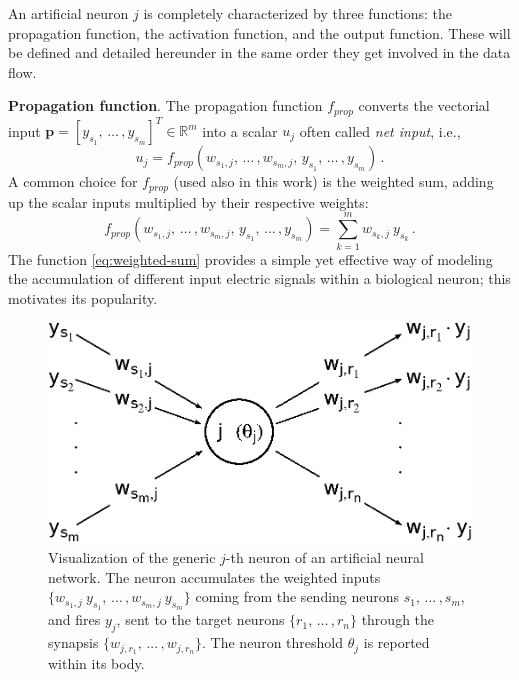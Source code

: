 \documentclass[12pt, a4paper, twoside, openright]{report}
\numberwithin{equation}{chapter}
\theoremstyle{theorem}
\theoremstyle{definition}
\theoremstyle{remark}
\theoremstyle{proposition}
\numberwithin{figure}{chapter}
\begin{document}
		An artificial neuron $j$ is completely characterized by three functions: the propagation function, the activation function, and the output function. These will be defined and detailed hereunder in the same order they get involved in the data flow. 
		
		\vspace*{0.3cm}
		
		\noindent \textbf{Propagation function}. The propagation function $f_{prop}$ converts the vectorial input $\mathbf{p} = [y_{s_1}, \, \ldots \, , y_{s_m}]^T \in \mathbb{R}^m$ into a scalar $u_{j}$ often called \emph{net input}, i.e.,
		\begin{equation}
			\label{eq:propagation-function}
			u_{j} = f_{prop}(w_{s_1,j}, \, \ldots \, , w_{s_m,j}, \, y_{s_1}, \, \ldots \, , y_{s_m}) \, .
		\end{equation}
		A common choice for $f_{prop}$ (used also in this work) is the weighted sum, adding up the scalar inputs multiplied by their respective weights:
		\begin{equation}
			\label{eq:weighted-sum}
			f_{prop}(w_{s_1,j}, \, \ldots \, , w_{s_m,j}, \, y_{s_1}, \, \ldots \, , y_{s_m}) = \sum_{k = 1}^m w_{s_k,j} ~ y_{s_k} \, .
		\end{equation} 
		The function \eqref{eq:weighted-sum} provides a simple yet effective way of modeling the accumulation of different input electric signals within a biological neuron; this motivates its popularity.
		
		\begin{figure}[t]
			\center
			\includegraphics[scale = 0.6]{neural_model_ter.eps}
			
			\caption{Visualization of the generic $j$-th neuron of an artificial neural network. The neuron accumulates the weighted inputs $\big\lbrace w_{s_1,j} ~ y_{s_1}, \, \ldots \, , w_{s_m,j} ~ y_{s_m} \big\rbrace$ coming from the sending neurons $s_1, \, \ldots \, , s_m$, and fires $y_j$, sent to the target neurons $\big\lbrace r_1, \, \ldots \, , r_n \big\rbrace$ through the synapsis $\big\lbrace w_{j,r_1}, \, \ldots \, , w_{j,r_n} \big\rbrace$. The neuron threshold $\theta_j$ is reported within its body.} 
			\label{fig:neural-model}
		\end{figure}
		
\end{document}
